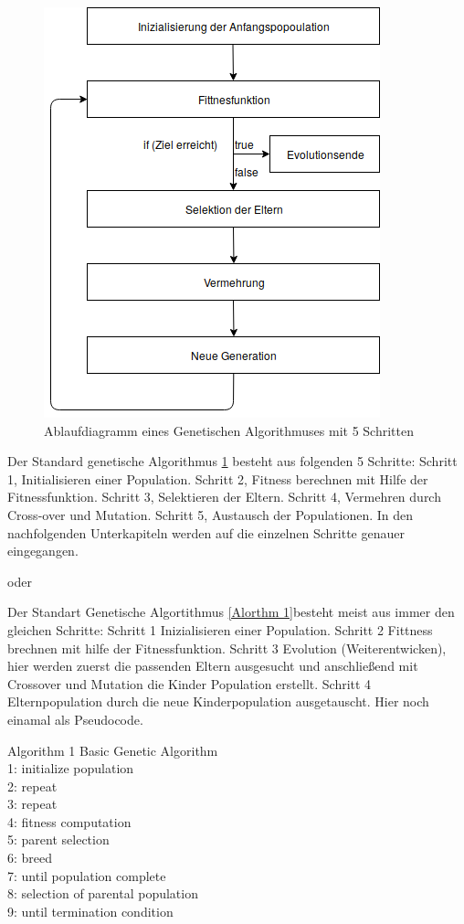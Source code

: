 \noindent%
\begin{figure}[H]
  \centering  
  \includegraphics[scale=0.5]{img/Ablauf_kurz.png}
  \caption{Ablaufdiagramm eines Genetischen Algorithmuses mit 5 Schritten}
  \label{fig:Ablauf_kurz}
\end{figure}

Der Standard genetische Algorithmus \ref{fig:Ablauf_kurz} besteht aus folgenden 5 Schritte:
Schritt 1, Initialisieren einer Population.
Schritt 2, Fitness berechnen mit Hilfe der Fitnessfunktion.
Schritt 3, Selektieren der Eltern.
Schritt 4, Vermehren durch Cross-over und Mutation.
Schritt 5, Austausch der Populationen.
In den nachfolgenden Unterkapiteln werden auf die einzelnen Schritte genauer eingegangen. 

\iffalse
oder 

Der Standart Genetische Algortithmus \ref{Alorthm 1}besteht meist aus immer den gleichen Schritte:
Schritt 1 Inizialisieren einer Population.
Schritt 2 Fittness brechnen mit hilfe der Fitnessfunktion.
Schritt 3 Evolution (Weiterentwicken), hier werden zuerst die passenden Eltern ausgesucht und anschließend mit Crossover und Mutation die Kinder Population erstellt. 
Schritt 4 Elternpopulation durch die neue Kinderpopulation ausgetauscht.
Hier noch einamal als Pseudocode.


Algorithm 1 Basic Genetic Algorithm \\
1: initialize population \\
2: repeat \\
3: 		repeat \\
4:			fitness computation \\
5:			parent selection \\
6:			breed \\
7:		until population complete \\
8:		selection of parental population \\
9: until termination condition \\

